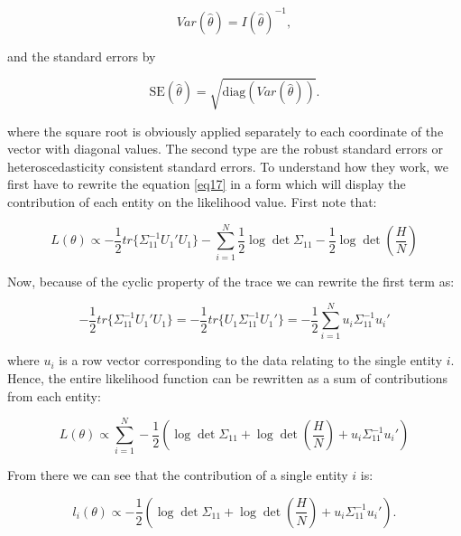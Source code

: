 \documentclass[a4paper]{article}
\begin{document}
\begin{equation}
Var(\hat{\theta}) = I(\hat{\theta})^{-1},
\end{equation}

\noindent and the standard errors by

\begin{equation}
\text{SE}(\hat{\theta}) = \sqrt{\text{diag}(Var(\hat{\theta}))}.
\end{equation}

\noindent where the square root is obviously applied separately to each coordinate of the vector with diagonal values.
The second type are the robust standard errors or heteroscedasticity consistent standard errors.
To understand how they work, we first have to rewrite the equation \autoref{eq17} in a form
which will display the contribution of each entity on the likelihood value.
First note that:

\begin{equation}
    L(\theta) \propto - \frac{1}{2} tr \{ \Sigma_{11}^{-1} U_1' U_1 \} - \sum_{i=1}^{N} \frac{1}{2} \log \det \Sigma_{11} - \frac{1}{2} \log \det (\frac{H}{N})
\end{equation}

\noindent Now, because of the cyclic property of the trace we can rewrite the first term as:

\begin{equation}
    - \frac{1}{2} tr \{ \Sigma_{11}^{-1} U_1' U_1 \} =
    - \frac{1}{2} tr \{ U_1 \Sigma_{11}^{-1} U_1' \} =
    - \frac{1}{2} \sum_{i=1}^N u_i \Sigma_{11}^{-1} u_i'
\end{equation}

\noindent where $u_i$ is a row vector corresponding to the data relating to the single entity $i$.
Hence, the entire likelihood function can be rewritten as a sum of contributions from each entity:

\begin{equation}
    L(\theta) \propto \sum_{i=1}^{N} -\frac{1}{2} (\log \det \Sigma_{11} + \log \det (\frac{H}{N}) + u_i \Sigma_{11}^{-1} u_i')
\end{equation}

\noindent From there we can see that the contribution of a single entity $i$ is:

\begin{equation}
 l_i(\theta) \propto -\frac{1}{2} (\log \det \Sigma_{11} + \log \det (\frac{H}{N}) + u_i \Sigma_{11}^{-1} u_i').
\end{equation}
\end{document}
